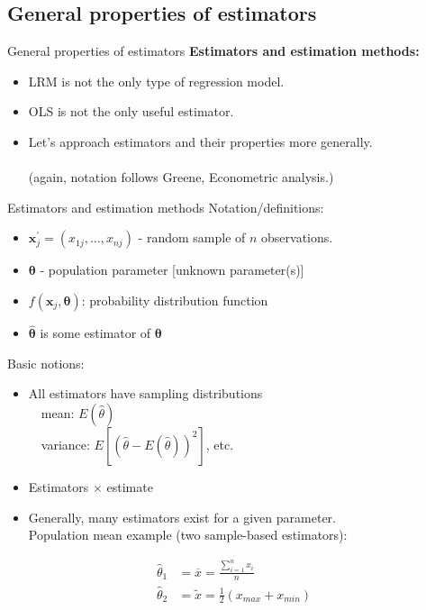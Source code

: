 \documentclass{beamer}
\begin{document}
\subsection{General properties of estimators}
\begin{frame}{General properties of estimators}
\textbf{Estimators and estimation methods:}\\ \bigskip
\begin{itemize}
    \item LRM is not the only type of regression model.
    \bigskip
    \item OLS is not the only useful estimator.
    \bigskip
    \item Let's approach estimators and their properties more generally.\\~\\
    (again, notation follows Greene, Econometric analysis.)
\end{itemize}
\end{frame}
\begin{frame}{Estimators and estimation methods}
Notation/definitions:
\begin{itemize}
\item $\bm{x}_j^{\prime} = (x_{1j},\dots,x_{nj})$ - random sample of $n$ observations.
\item $\bm{\theta}$ - population parameter [unknown parameter(s)]
\item $f(\bm{x}_j,\bm{\theta})$: probability distribution function
\item $\hat{\bm{\theta}}$ is some estimator of $\bm{\theta}$
\end{itemize}
\medskip
Basic notions: 
\begin{itemize}
\item All estimators have sampling distributions\\
~~mean: $E(\hat{\theta})$\\
~~variance: $E[(\hat{\theta}-E(\hat{\theta}))^2]$, etc.\\
\item Estimators $\times$ estimate 
\item Generally, many estimators exist for a given parameter. \\Population mean example (two sample-based estimators):
\end{itemize}
\begin{align*}
\hat{\theta}_1 & = \overline{x} = \frac{\sum_{i=1}^nx_i}{n}\\
\hat{\theta}_2 & = \tilde{x} = \frac{1}{2}(x_{max} +x_{min})
\end{align*}
\end{frame}
\end{document}

